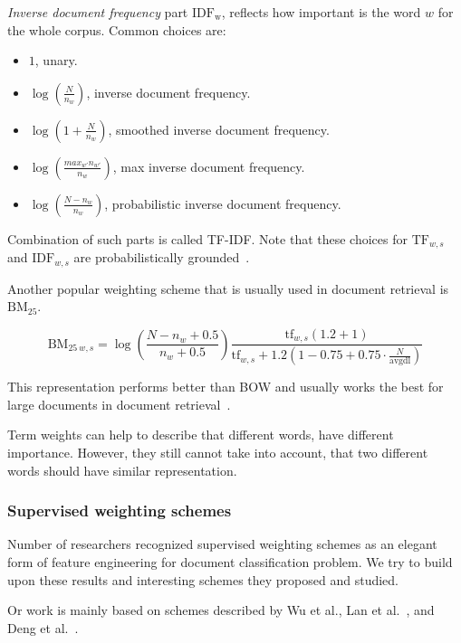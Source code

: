     \emph{Inverse document frequency} part $\mathrm{IDF_w}$, reflects how important is the word $w$ for the whole corpus.
    Common choices are:
    \begin{itemize}
        \item $1$, unary.
        \item $\log \left(\frac{N}{n_w} \right)$, inverse document frequency.
        \item $\log \left( 1+\frac{N}{n_w} \right)$, smoothed inverse document frequency.
        \item $\log \left( \frac{max_{w'} n_{w'}}{n_w} \right)$, max inverse document frequency.
        \item $\log \left(\frac{N-n_w}{n_w} \right)$, probabilistic inverse document frequency.
    \end{itemize}

    Combination of such parts is called TF-IDF.
    Note that these choices for $\mathrm{TF}_{w,s}$ and $\mathrm{IDF}_{w,s}$ are probabilistically grounded~\cite{aizawa2003information}. %
    
    Another popular weighting scheme that is usually used in document retrieval is $\mathrm{BM_{25}}$. 
    
    $$\mathrm{BM}_{25~w,s} = \log \left(\frac{N-n_w+0.5}{n_w + 0.5}\right)    \frac{\mathrm{tf}_{w,s} (1.2 + 1)}{\mathrm{tf}_{w,s} + 1.2  \left(1 - 0.75 + 0.75 \cdot \frac{N}{\text{avgdl}}\right)}$$
    
    This representation performs better than BOW and usually works the best for large documents in document retrieval~\cite{li2014semantic}.
    
    Term weights can help to describe that different words, have different importance.
    However, they still cannot take into account, that two different words should have similar representation.
    
    \subsubsection{Supervised weighting schemes} \label{sec:supervised:weights}
    \* %
    Number of researchers recognized supervised weighting schemes as an elegant form of feature engineering for document classification problem.
    We try to build upon these results and interesting schemes they proposed and studied.
    
    Or work is mainly based on schemes described by Wu et al.\cite{wu2017balancing}, %
    Lan et al.~\cite{lan2009supervised}, %
    and Deng et al.~\cite{deng2014study}. %
    
